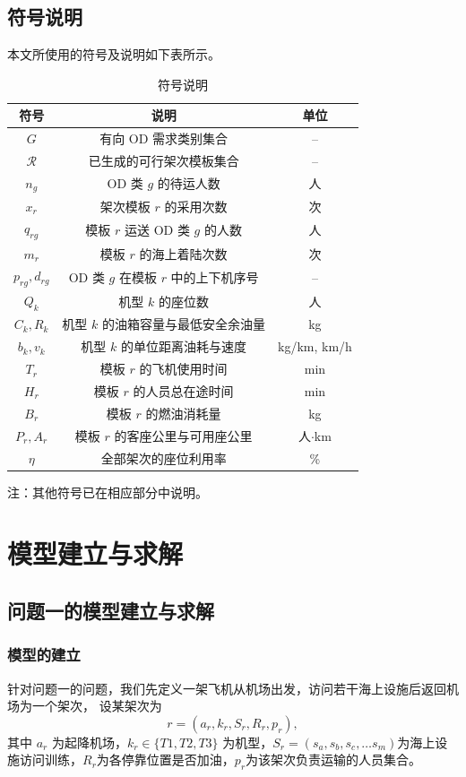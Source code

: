 \documentclass[UTF-8,a4paper,zihao=-4]{ctexart}
\begin{document}
\subsection{符号说明}
本文所使用的符号及说明如下表所示。
\begin{table}[htbp]
\centering
{}

\caption{符号说明}
\begin{tabular}{ccc}
\toprule
符号 & 说明 & 单位 \\
\midrule
$G$ & 有向 OD 需求类别集合 & -- \\
$\mathcal R$ & 已生成的可行架次模板集合 & -- \\
$n_g$ & OD 类 $g$ 的待运人数 & 人 \\
$x_r$ & 架次模板 $r$ 的采用次数 & 次 \\
$q_{rg}$ & 模板 $r$ 运送 OD 类 $g$ 的人数 & 人 \\
$m_r$ & 模板 $r$ 的海上着陆次数 & 次 \\
$p_{rg},d_{rg}$ & OD 类 $g$ 在模板 $r$ 中的上下机序号 & -- \\
$Q_k$ & 机型 $k$ 的座位数 & 人 \\
$C_k,R_k$ & 机型 $k$ 的油箱容量与最低安全余油量 & kg \\
$b_k,v_k$ & 机型 $k$ 的单位距离油耗与速度 & kg/km, km/h \\
$T_r$ & 模板 $r$ 的飞机使用时间 & min \\
$H_r$ & 模板 $r$ 的人员总在途时间 & min \\
$B_r$ & 模板 $r$ 的燃油消耗量 & kg \\
$P_r,A_r$ & 模板 $r$ 的客座公里与可用座公里 & 人$\cdot$km \\
$\eta$ & 全部架次的座位利用率 & \% \\
\bottomrule
\end{tabular}

\vspace{0.5em}
\parbox{0.9\textwidth}{
注：其他符号已在相应部分中说明。
}
\end{table}
\FloatBarrier

\section{模型建立与求解}
\subsection{问题一的模型建立与求解}
\subsubsection{模型的建立}
针对问题一的问题，我们先定义一架飞机从机场出发，访问若干海上设施后返回机场为一个架次，
设某架次为
\begin{equation}
 r=\left(a_r,k_r,S_r,R_r,p_r\right),
\end{equation}
其中 $a_r$ 为起降机场，$k_r\in\{T1,T2,T3\}$ 为机型，$S_r=(s_a,s_b,s_c,\ldots s_m)$为海上设施访问训练，$R_r$为各停靠位置是否加油，$p_r$为该架次负责运输的人员集合。
\end{document}
